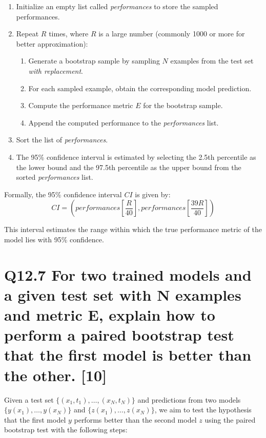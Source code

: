 \documentclass[11pt]{article}
\begin{document}
\begin{enumerate}
    \item Initialize an empty list called \textit{performances} to store the sampled performances.
    \item Repeat $R$ times, where $R$ is a large number (commonly 1000 or more for better approximation):
    \begin{enumerate}
        \item Generate a bootstrap sample by sampling $N$ examples from the test set \textit{with replacement}.
        \item For each sampled example, obtain the corresponding model prediction.
        \item Compute the performance metric $E$ for the bootstrap sample.
        \item Append the computed performance to the \textit{performances} list.
    \end{enumerate}
    \item Sort the list of \textit{performances}.
    \item The 95\% confidence interval is estimated by selecting the 2.5th percentile as the lower bound and the 97.5th percentile as the upper bound from the sorted \textit{performances} list.
\end{enumerate}

Formally, the 95\% confidence interval $CI$ is given by:
\[
CI = \left( \textit{performances}\left[ \frac{R}{40} \right], \textit{performances}\left[ \frac{39R}{40} \right] \right)
\]

This interval estimates the range within which the true performance metric of the model lies with 95\% confidence.

\section{Q12.7 For two trained models and a given test set with N examples and metric E, explain how to perform a paired bootstrap test that the first model is better than the other. [10]}


Given a test set $\{ (x_1, t_1), \ldots, (x_N, t_N) \}$ and predictions from two models $\{y(x_1), \ldots, y(x_N)\}$ and $\{z(x_1), \ldots, z(x_N)\}$, we aim to test the hypothesis that the first model \(y\) performs better than the second model \(z\) using the paired bootstrap test with the following steps:
\end{document}
